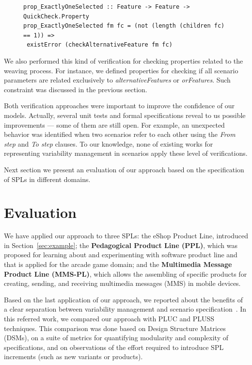 \documentclass{acm_proc_article-sp}
\begin{document}
{\begin{figure} 
\begin{lstlisting}[belowskip=10pt,frame=tb,caption={Example of QuickCheck property},label=lst:quick-check]
prop_ExactlyOneSelected :: Feature -> Feature -> QuickCheck.Property 
prop_ExactlyOneSelected fm fc = (not (length (children fc) == 1)) => 
 existError (checkAlternativeFeature fm fc) 
\end{lstlisting}
\end{figure}

We also performed this kind of verification for checking properties related to the weaving process. For instance, we defined properties for checking if all scenario parameters are related exclusively to \emph{alternativeFeatures} or \emph{orFeatures}. Such constraint was discussed in the previous section.  

Both verification approaches were important to improve the confidence of our models. Actually, several unit tests and formal specifications reveal to us possible improvements --- some  of them are still open. For example, an unexpected behavior was identified when two scenarios refer to each other using the \emph{From step} and \emph{To step} clauses. 
To our knowledge, none of existing works for representing variability management in scenarios apply these level of verifications.

Next section we present an evaluation of our approach based on the 
specification of SPLs in different domains. 

\section{Evaluation}
\label{sec:evaluation}

We have applied our approach to three SPLs: the eShop Product Line, introduced in Section~\ref{sec:example}; the  
{\bf Pedagogical Product Line (PPL)}, which was proposed for learning about and experimenting with software product line and that is applied for the arcade game domain; and the 
{\bf Multimedia Message Product Line (MMS-PL)}, which allows the assembling of specific products for creating, sending, and receiving multimedia messages (MMS) in mobile devices.

Based on the last application of our approach, we reported about the benefits of a clear separation between variability management and scenario specification~\cite{rbonifacio-ea-2008}. In this referred work, we compared our approach with PLUC and PLUSS techniques. This comparison was done based on Design Structure Matrices (DSMs), on a suite of metrics for quantifying modularity and complexity of specifications, and on observations of the effort required to introduce SPL increments (such as new variants or products). 

}
\end{document}
